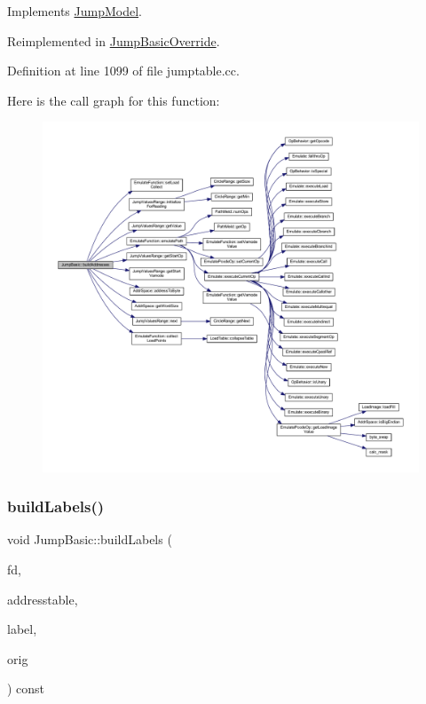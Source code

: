 Implements \mbox{\hyperlink{class_jump_model_a12659a93442cc2940a8fed8dc55be2e0}{Jump\+Model}}.



Reimplemented in \mbox{\hyperlink{class_jump_basic_override_ad9a026df124c7e57722bdc1903033ebb}{Jump\+Basic\+Override}}.



Definition at line 1099 of file jumptable.\+cc.

Here is the call graph for this function\+:
\nopagebreak
\begin{figure}[H]
\begin{center}
\leavevmode
\includegraphics[width=350pt]{class_jump_basic_a42533b11d12a5f819bb88abb21037d94_cgraph}
\end{center}
\end{figure}
\mbox{\label{class_jump_basic_ad3c8a1257f973c18e25935ee932076c4}} 
\subsubsection{\texorpdfstring{buildLabels()}{buildLabels()}}
{\footnotesize\ttfamily void Jump\+Basic\+::build\+Labels (\begin{DoxyParamCaption}\item[{\mbox{\hyperlink{class_funcdata}{Funcdata}} $\ast$}]{fd,  }\item[{vector$<$ \mbox{\hyperlink{class_address}{Address}} $>$ \&}]{addresstable,  }\item[{vector$<$ \mbox{\hyperlink{types_8h_a2db313c5d32a12b01d26ac9b3bca178f}{uintb}} $>$ \&}]{label,  }\item[{const \mbox{\hyperlink{class_jump_model}{Jump\+Model}} $\ast$}]{orig }\end{DoxyParamCaption}) const\hspace{0.3cm}{\ttfamily [virtual]}}



